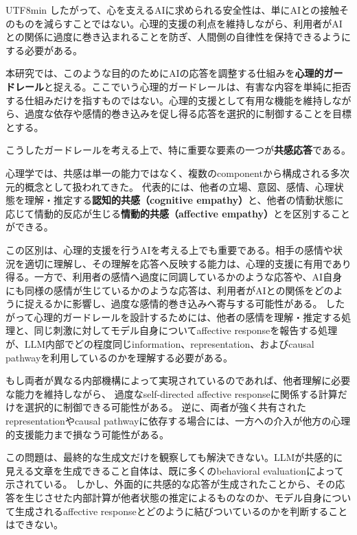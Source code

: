 \documentclass{article} %
\begin{document}
\begin{CJK*}{UTF8}{min}
したがって、心を支えるAIに求められる安全性は、単にAIとの接触そのものを減らすことではない。心理的支援の利点を維持しながら、利用者がAIとの関係に過度に巻き込まれることを防ぎ、人間側の自律性を保持できるようにする必要がある。

本研究では、このような目的のためにAIの応答を調整する仕組みを\textbf{心理的ガードレール}と捉える。ここでいう心理的ガードレールは、有害な内容を単純に拒否する仕組みだけを指すものではない。心理的支援として有用な機能を維持しながら、過度な依存や感情的巻き込みを促し得る応答を選択的に制御することを目標とする。

こうしたガードレールを考える上で、特に重要な要素の一つが\textbf{共感応答}である。

心理学では、共感は単一の能力ではなく、複数のcomponentから構成される多次元的概念として扱われてきた\citep{davis1983measuring,decety2004functional,himichi2017development}。
代表的には、他者の立場、意図、感情、心理状態を理解・推定する\textbf{認知的共感（cognitive empathy）}と、他者の情動状態に応じて情動的反応が生じる\textbf{情動的共感（affective empathy）}とを区別することができる\citep{singer2009social,shamay2011neural}。

この区別は、心理的支援を行うAIを考える上でも重要である。相手の感情や状況を適切に理解し、その理解を応答へ反映する能力は、心理的支援に有用であり得る。一方で、利用者の感情へ過度に同調しているかのような応答や、AI自身にも同様の感情が生じているかのような応答は、利用者がAIとの関係をどのように捉えるかに影響し、過度な感情的巻き込みへ寄与する可能性がある\citep{laestadius2024too,zhang2025approach}。
したがって心理的ガードレールを設計するためには、他者の感情を理解・推定する処理と、同じ刺激に対してモデル自身についてaffective responseを報告する処理が、LLM内部でどの程度同じinformation、representation、およびcausal pathwayを利用しているのかを理解する必要がある。

もし両者が異なる内部機構によって実現されているのであれば、他者理解に必要な能力を維持しながら、
過度なself-directed affective responseに関係する計算だけを選択的に制御できる可能性がある。
逆に、両者が強く共有されたrepresentationやcausal pathwayに依存する場合には、一方への介入が他方の心理的支援能力まで損なう可能性がある。

この問題は、最終的な生成文だけを観察しても解決できない。LLMが共感的に見える文章を生成できること自体は、既に多くのbehavioral evaluationによって示されている\citep{ayers2023comparing,elyoseph2023chatgpt,huang2023emotionally,yu2025can}。
しかし、外面的に共感的な応答が生成されたことから、その応答を生じさせた内部計算が他者状態の推定によるものなのか、モデル自身について生成されるaffective responseとどのように結びついているのかを判断することはできない。


\end{CJK*}
\end{document}

